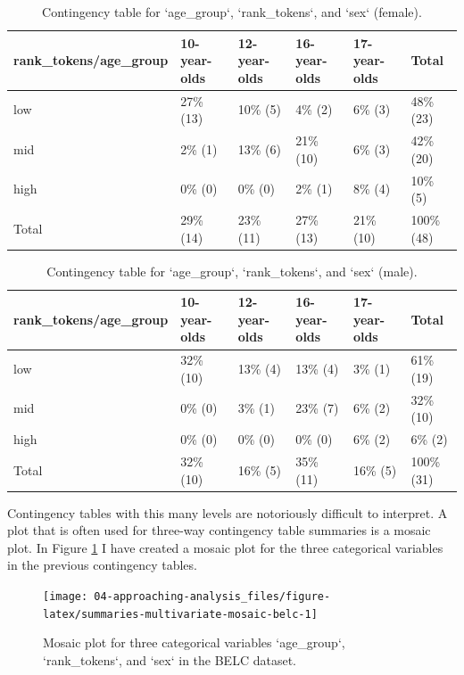 \documentclass[
]{article}
\begin{document}
\begin{table}

\caption{\label{tab:summaries-multivariate-categorical-table-belc-female}Contingency table for `age_group`, `rank_tokens`, and `sex` (female).}
\centering
\begin{tabular}[t]{llllll}
\toprule
rank\_tokens/age\_group & 10-year-olds & 12-year-olds & 16-year-olds & 17-year-olds & Total\\
\midrule
low & 27\% (13) & 10\%  (5) & 4\%  (2) & 6\%  (3) & 48\% (23)\\
mid & 2\%  (1) & 13\%  (6) & 21\% (10) & 6\%  (3) & 42\% (20)\\
high & 0\%  (0) & 0\%  (0) & 2\%  (1) & 8\%  (4) & 10\%  (5)\\
Total & 29\% (14) & 23\% (11) & 27\% (13) & 21\% (10) & 100\% (48)\\
\bottomrule
\end{tabular}
\end{table}

\begin{table}

\caption{\label{tab:summaries-multivariate-categorical-table-belc-male}Contingency table for `age_group`, `rank_tokens`, and `sex` (male).}
\centering
\begin{tabular}[t]{llllll}
\toprule
rank\_tokens/age\_group & 10-year-olds & 12-year-olds & 16-year-olds & 17-year-olds & Total\\
\midrule
low & 32\% (10) & 13\% (4) & 13\%  (4) & 3\% (1) & 61\% (19)\\
mid & 0\%  (0) & 3\% (1) & 23\%  (7) & 6\% (2) & 32\% (10)\\
high & 0\%  (0) & 0\% (0) & 0\%  (0) & 6\% (2) & 6\%  (2)\\
Total & 32\% (10) & 16\% (5) & 35\% (11) & 16\% (5) & 100\% (31)\\
\bottomrule
\end{tabular}
\end{table}

Contingency tables with this many levels are notoriously difficult to interpret. A plot that is often used for three-way contingency table summaries is a mosaic plot. In Figure \ref{fig:summaries-multivariate-mosaic-belc} I have created a mosaic plot for the three categorical variables in the previous contingency tables.

\begin{figure}

{\centering \texttt{[image: 04-approaching-analysis\_files/figure-latex/summaries-multivariate-mosaic-belc-1]} 

}

\caption{Mosaic plot for three categorical variables `age_group`, `rank_tokens`, and `sex` in the BELC dataset.}\label{fig:summaries-multivariate-mosaic-belc}
\end{figure}
\end{document}
